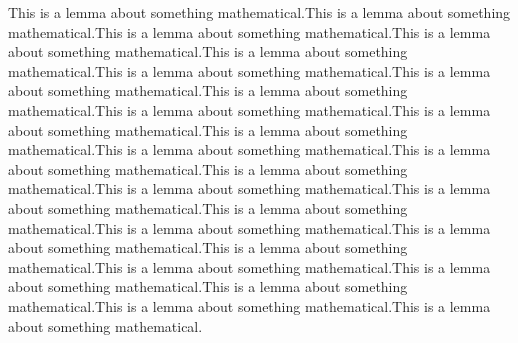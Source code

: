 \documentclass[7pt]{article}
\begin{document}
\pagestyle{fancy}
\rfoot{\today}
\renewcommand\headheight{15pt}
\renewcommand\footrulewidth{0.4pt}
\setlength{\parskip}{0pt}
\setlength{\parsep}{0pt}
\setlength{\headsep}{0pt}
\setlength{\topskip}{15pt}
\setlength{\topmargin}{0pt}
\setlength{\topsep}{0pt}
\setlength{\partopsep}{0pt}

\begin{multicols}{2}
This is a lemma about something mathematical.This is a lemma about something mathematical.This is a lemma about something mathematical.This is a lemma about something mathematical.This is a lemma about something mathematical.This is a lemma about something mathematical.This is a lemma about something mathematical.This is a lemma about something mathematical.This is a lemma about something mathematical.This is a lemma about something mathematical.This is a lemma about something mathematical.This is a lemma about something mathematical.This is a lemma about something mathematical.This is a lemma about something mathematical.This is a lemma about something mathematical.This is a lemma about something mathematical.This is a lemma about something mathematical.This is a lemma about something mathematical.This is a lemma about something mathematical.This is a lemma about something mathematical.This is a lemma about something mathematical.This is a lemma about something mathematical.This is a lemma about something mathematical.This is a lemma about something mathematical.This is a lemma about something mathematical.

% 
% 
\end{multicols}
\end{document}

